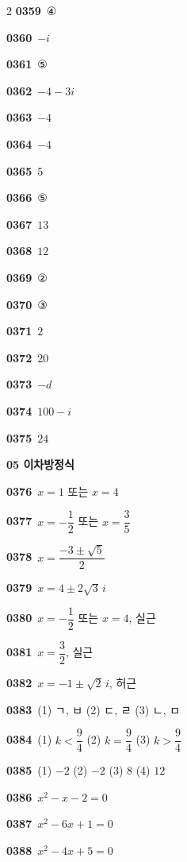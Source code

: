 \documentclass[10pt,a4paper]{article}
\begin{document}
\begin{multicols}{2}
\noindent\textbf{0359}\ ④\par
\noindent\textbf{0360}\ $-i$\par
\noindent\textbf{0361}\ ⑤\par
\noindent\textbf{0362}\ $-4-3i$\par
\noindent\textbf{0363}\ $-4$\par
\noindent\textbf{0364}\ $-4$\par
\noindent\textbf{0365}\ $5$\par
\noindent\textbf{0366}\ ⑤\par
\noindent\textbf{0367}\ $13$\par
\noindent\textbf{0368}\ $12$\par
\noindent\textbf{0369}\ ②\par
\noindent\textbf{0370}\ ③\par
\noindent\textbf{0371}\ $2$\par
\noindent\textbf{0372}\ $20$\par
\noindent\textbf{0373}\ $-d$\par
\noindent\textbf{0374}\ $100-i$\par
\noindent\textbf{0375}\ $24$\par
\noindent\textbf{05 이차방정식}\par\smallskip
\noindent\textbf{0376}\ $x=1$ 또는 $x=4$\par
\noindent\textbf{0377}\ $x=-\dfrac{1}{2}$ 또는 $x=\dfrac{3}{5}$\par
\noindent\textbf{0378}\ $x=\dfrac{-3\pm\sqrt{5}}{2}$\par
\noindent\textbf{0379}\ $x=4\pm2\sqrt{3}\,i$\par
\noindent\textbf{0380}\ $x=-\dfrac{1}{2}$ 또는 $x=4$, 실근\par
\noindent\textbf{0381}\ $x=\dfrac{3}{2}$, 실근\par
\noindent\textbf{0382}\ $x=-1\pm\sqrt{2}\,i$, 허근\par
\noindent\textbf{0383}\ (1) ㄱ, ㅂ \quad (2) ㄷ, ㄹ \quad (3) ㄴ, ㅁ\par
\noindent\textbf{0384}\ (1) $k<\dfrac{9}{4}$ \quad (2) $k=\dfrac{9}{4}$ \quad (3) $k>\dfrac{9}{4}$\par
\noindent\textbf{0385}\ (1) $-2$ \quad (2) $-2$ \quad (3) $8$ \quad (4) $12$\par
\noindent\textbf{0386}\ $x^2-x-2=0$\par
\noindent\textbf{0387}\ $x^2-6x+1=0$\par
\noindent\textbf{0388}\ $x^2-4x+5=0$\par

\end{multicols}
\end{document}
